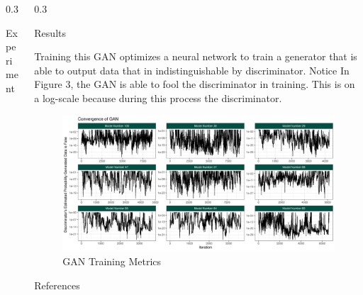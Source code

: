 \documentclass{msuposter}
\newcommand{\colwidth}{0.3\linewidth}
\begin{document}
\begin{frame}{}
\begin{columns}[t]
\begin{column}{\colwidth}
\begin{block}{Experiment}
\end{block}
\end{column}


\begin{column}{\colwidth}


\begin{block}{Results}

Training this GAN optimizes a neural network to train a generator that is able to output data that in indistinguishable by discriminator. Notice In Figure 3, the GAN is able to fool the discriminator in training. This is on a log-scale because during this process the discriminator.

\begin{figure}
  \includegraphics[width=\linewidth]{gan_converging.png}
  	\caption{\label{fig:my-label} GAN Training Metrics}
\end{figure}
\end{block}



\begin{block}{References}
\scriptsize


\end{block}

\end{column}

\end{columns}
	\end{frame}
\end{document}
